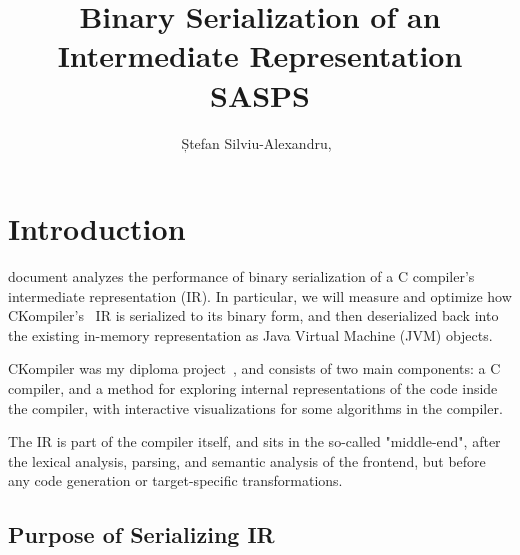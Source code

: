 \documentclass[lettersize,journal]{IEEEtran}
\begin{document}
    \title{Binary Serialization of an Intermediate Representation\\SASPS}

    \author{Ștefan Silviu-Alexandru,~}

    \maketitle


    \section{Introduction}\label{sec:introduction}

     document analyzes the performance of binary serialization of a C compiler's intermediate
    representation (IR).
    In particular, we will measure and optimize how CKompiler's~\cite{ckompiler-github} IR is serialized to its binary
    form, and then deserialized back into the existing in-memory representation as Java Virtual Machine (JVM) objects.

    CKompiler was my diploma project~\cite{ckompiler}, and consists of two main components:
    a C compiler, and a method for exploring internal representations of the code inside the compiler, with interactive
    visualizations for some algorithms in the compiler.

    The IR is part of the compiler itself, and sits in the so-called "middle-end", after the lexical analysis, parsing,
    and semantic analysis of the frontend, but before any code generation or target-specific transformations.

    \subsection{Purpose of Serializing IR}\label{subsec:purpose-of-serializing-ir}
\end{document}
